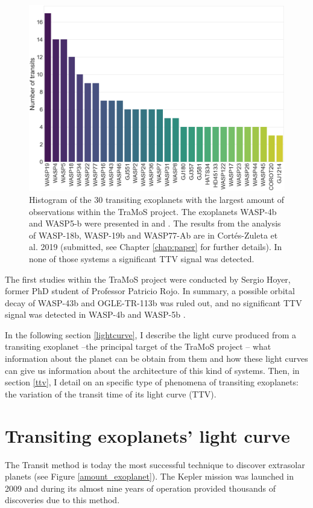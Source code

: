 \begin{figure}[ht]
\centering
\includegraphics[width=0.9\columnwidth]{imagenes/tramos.png}
\caption{Histogram of the 30 transiting exoplanets with the largest amount of observations within the TraMoS project. The exoplanets WASP-4b and WASP5-b were presented in \cite{Hoyer2012} and \cite{Hoyer2013}. The results from the analysis of WASP-18b, WASP-19b and WASP77-Ab are in Cortés-Zuleta et al. 2019 (submitted, see Chapter \ref{chap:paper} for further details). In none of those systems a significant TTV signal was detected.}
\label{tramos}
\end{figure}


The first studies within the TraMoS project were conducted by Sergio Hoyer, former PhD student of Professor Patricio Rojo. In summary, a possible orbital decay of WASP-43b \citep{Hoyer2016b} and OGLE-TR-113b \citep{Hoyer2016} was ruled out, and no significant TTV signal was detected in WASP-4b \citep{Hoyer2012} and WASP-5b \citep{Hoyer2013}.

In the following section \ref{lightcurve}, I describe the light curve produced from a transiting exoplanet --the principal target of the TraMoS project --  what information about the planet can be obtain from them and how these light curves can give us information about the architecture of this kind of systems. Then, in section \ref{ttv}, I detail on an specific type of phenomena of transiting exoplanets: the variation of the transit time of its light curve (TTV).

\section{Transiting exoplanets' light curve\label{lightcurve}}
The Transit method is today the most successful technique to discover extrasolar planets (see Figure \ref{amount_exoplanet}). The Kepler mission was launched in 2009 and during its almost nine years of operation provided thousands of discoveries due to this method.

